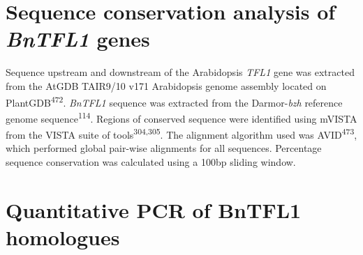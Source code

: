 \documentclass[12pt,]{book}
\begin{document}
\section{\texorpdfstring{Sequence conservation analysis of \emph{BnTFL1}
genes}{Sequence conservation analysis of BnTFL1 genes}}\label{sequence-conservation-analysis-of-bntfl1-genes}

Sequence upstream and downstream of the Arabidopsis \emph{TFL1} gene was
extracted from the AtGDB TAIR9/10 v171 Arabidopsis genome assembly
located on PlantGDB\textsuperscript{472}. \emph{BnTFL1} sequence was
extracted from the Darmor-\emph{bzh} reference genome
sequence\textsuperscript{114}. Regions of conserved sequence were
identified using mVISTA from the VISTA suite of
tools\textsuperscript{304,305}. The alignment algorithm used was
AVID\textsuperscript{473}, which performed global pair-wise alignments
for all sequences. Percentage sequence conservation was calculated using
a 100bp sliding window.

\section{Quantitative PCR of BnTFL1 homologues}\label{methods:qpcr}

\begin{table}[htp]
\caption{\textbf{\emph{BnTFL1} and \emph{BnGAPDH} qPCR primer sequences.}}
\label{methods:qpcr}
\begin{center}
\end{center}
\end{table}
\end{document}
